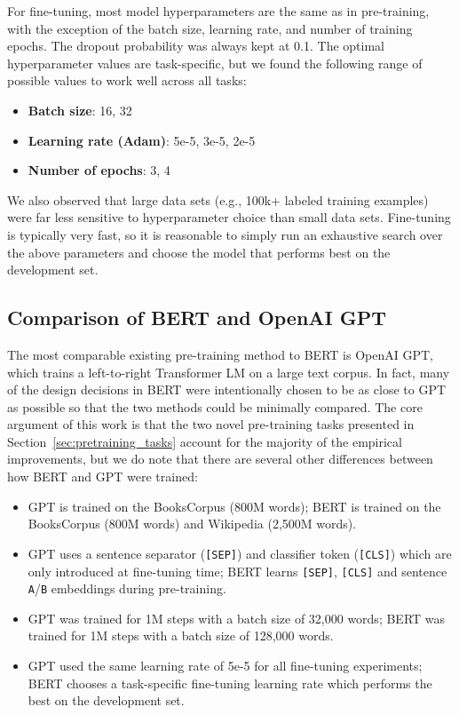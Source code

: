For fine-tuning, most model hyperparameters are the same as in pre-training, with the exception of the batch size, learning rate, and number of training epochs. The dropout probability was always kept at 0.1. The optimal hyperparameter values are task-specific, but we found the following range of possible values to work well across all tasks:

\begin{itemize}[noitemsep]
\item {\bf Batch size}: 16, 32
\item {\bf Learning rate (Adam)}: 5e-5, 3e-5, 2e-5
\item {\bf Number of epochs}: 3, 4
\end{itemize}

We also observed that large data sets (e.g., 100k+ labeled training examples) were far less sensitive to hyperparameter choice than small data sets. Fine-tuning is typically very fast, so it is reasonable to simply run an exhaustive search over the above parameters and choose the model that performs best on the development set.

\subsection{Comparison of BERT and OpenAI GPT}
\label{sec:comparing_bert_and_openai}

The most comparable existing pre-training method to BERT is OpenAI GPT, which trains a left-to-right Transformer LM on a large text corpus. In fact, many of the design decisions in BERT were intentionally chosen to be as close to GPT as possible so that the two methods could be minimally compared. The core argument of this work is that the two novel pre-training tasks presented in Section~\ref{sec:pretraining_tasks} account for the majority of the empirical improvements, but we do note that there are several other differences between how BERT and GPT were trained:

\begin{itemize}
\item GPT is trained on the BooksCorpus (800M words); BERT is trained on the BooksCorpus (800M words) and Wikipedia (2,500M words).
\item GPT uses a sentence separator ({\tt [SEP]}) and classifier token ({\tt [CLS]}) which are only introduced at fine-tuning time; BERT learns {\tt [SEP]}, {\tt [CLS]} and sentence {\tt A}/{\tt B} embeddings during pre-training.
\item GPT was trained for 1M steps with a batch size of 32,000 words; BERT was trained for 1M steps with a batch size of 128,000 words.
\item GPT used the same learning rate of 5e-5 for all fine-tuning experiments; BERT chooses a task-specific fine-tuning learning rate which performs the best on the development set.
\end{itemize}

